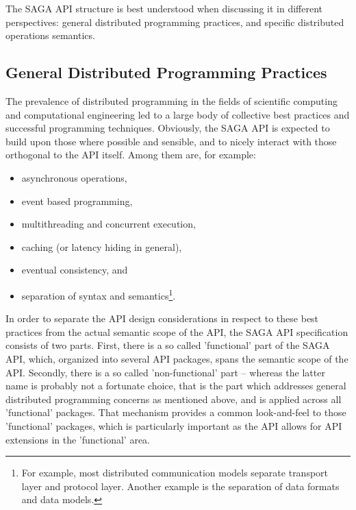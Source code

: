 \documentclass[a4paper,12pt]{article}
\begin{document}
 The SAGA API structure is best understood when discussing it in
 different perspectives: general distributed programming practices,
 and specific distributed operations semantics.

 \subsection{General Distributed Programming Practices}
 \label{ssec.bestpractices}
 
  The prevalence of distributed programming in the fields of
  scientific computing and computational engineering led to a large
  body of collective best practices and successful programming
  techniques.  Obviously, the SAGA API is expected to build upon those
  where possible and sensible, and to nicely interact with those
  orthogonal to the API itself.  Among them are, for example:

  \begin{itemize}

   \item asynchronous operations,
   \item event based programming,
   \item multithreading and concurrent execution, 
   \item caching (or latency hiding in general), 
   \item eventual consistency, and 
   \item separation of syntax and semantics\footnote{For example, most
         distributed communication models separate transport layer and 
         protocol layer.  Another example is the separation of data 
         formats and data models.}.
  \end{itemize}

  In order to separate the API design considerations in respect to
  these best practices from the actual semantic scope of the API, the
  SAGA API specification consists of two parts.  First, there is a so
  called 'functional' part of the SAGA API, which, organized into
  several API packages, spans the semantic scope of the API.
  Secondly, there is a so called 'non-functional' part -- whereas the
  latter name is probably not a fortunate choice, that is the part
  which addresses general distributed programming concerns as
  mentioned above, and is applied across all 'functional' packages.
  That mechanism provides a common look-and-feel to those 'functional'
  packages, which is particularly important as the API allows for API
  extensions in the 'functional' area.
\end{document}
